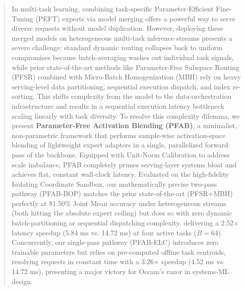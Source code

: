 \begin{abstract}
  In multi-task learning, combining task-specific Parameter-Efficient Fine-Tuning (PEFT) experts via model merging offers a powerful way to serve diverse requests without model duplication. However, deploying these merged models on heterogeneous multi-task inference streams presents a severe challenge: standard dynamic routing collapses back to uniform compromises because batch-averaging washes out individual task signals, while prior state-of-the-art methods like Parameter-Free Subspace Routing (PFSR) combined with Micro-Batch Homogenization (MBH) rely on heavy serving-level data partitioning, sequential execution dispatch, and index re-sorting. This shifts complexity from the model to the data-orchestration infrastructure and results in a sequential execution latency bottleneck scaling linearly with task diversity. To resolve this complexity dilemma, we present \textbf{Parameter-Free Activation Blending (PFAB)}, a minimalist, non-parametric framework that performs sample-wise activation-space blending of lightweight expert adapters in a single, parallelized forward pass of the backbone. Equipped with Unit-Norm Calibration to address scale imbalance, PFAB completely prunes serving-layer systems bloat and achieves flat, constant wall-clock latency. Evaluated on the high-fidelity Isolating Coordinate Sandbox, our mathematically precise two-pass pathway (PFAB-BOP) matches the prior state-of-the-art (PFSR+MBH) perfectly at 81.50\% Joint Mean accuracy under heterogeneous streams (both hitting the absolute expert ceiling) but does so with zero dynamic batch-partitioning or sequential dispatching complexity, delivering a 2.52$\times$ latency speedup (5.84 ms vs. 14.72 ms) at four active tasks ($B=64$). Concurrently, our single-pass pathway (PFAB-ELC) introduces zero trainable parameters but relies on pre-computed offline task centroids, resolving requests in constant time with a 3.26$\times$ speedup (4.52 ms vs. 14.72 ms), presenting a major victory for Occam's razor in systems-ML design.
\end{abstract}
